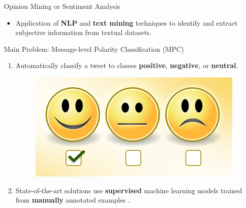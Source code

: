 \documentclass[handout]{beamer}
\begin{document}
\begin{frame}{Opinion Mining or Sentiment Analysis}
\begin{scriptsize}\begin{itemize}
 \item Application of \textbf{NLP} and \textbf{text mining} techniques to identify and extract subjective information from textual datasets.
\end{itemize}

\begin{block}{Main Problem: Message-level Polarity Classification (MPC)}
  \begin{enumerate}
   \item Automatically classify a tweet to classes \textcolor[rgb]{0.00,0.00,1.00}{\textbf{positive}}, \textcolor[rgb]{1.00,0.00,0.00}{\textbf{negative}}, or \textcolor[rgb]{0.00,1.00,0.00}{\textbf{neutral}}. 
   
     \begin{figure}[h]
        	\includegraphics[scale = 0.15]{pics/sent.png}
        \end{figure}
   
   \item State-of-the-art solutions use \textbf{supervised} machine learning models trained from \textbf{manually} annotated examples \cite{Mohammad2013}.
  \end{enumerate} 
\end{block}

\end{scriptsize}

\end{frame}
\end{document}
